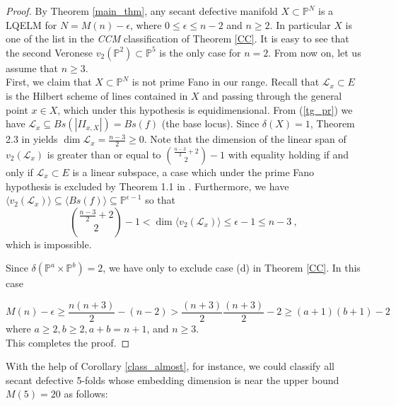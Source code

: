 \documentclass[11pt]{amsart}
\def\P{{\mathbb P}}
\theoremstyle{theorem} %
\theoremstyle{definition}
\numberwithin{equation}{section}
\begin{document}
\begin{proof}
By Theorem \ref{main_thm}, any secant defective manifold $X\subset\P^N$ is a LQELM for $N=M(n)-\epsilon$, where  $0\le\epsilon\le n-2$ and $n\ge 2$. In particular $X$ is one of the list in the \textit{CCM} classification of Theorem \ref{CC}. It is easy to see that the second Veronese $v_2(\P^2)\subset\P^5$ is the only case for $n=2$. From now on, let us assume that $n\ge3$.\\

First, we claim that $X\subset\P^N$ is not prime Fano in our range. Recall that $\mathcal{L}_x\subset E$ is the Hilbert scheme of lines contained in $X$ and passing through the general point $x\in X$, which under this hypothesis is equidimensional. From (\ref{tg_pr}) we have $\mathcal L_{x}\subseteq Bs(|II_{x,X}|)=Bs(f)$ (the base locus). Since $\delta(X)=1$, Theorem 2.3 in \cite{Ru} yields $\dim\mathcal{L}_x =\frac{n-3}{2}\ge 0$. Note that the dimension of the linear span of $v_2(\mathcal{L}_x)$ is greater than or equal to ${\frac{n-3}{2}+2 \choose 2}-1$ with equality holding if and only if $\mathcal{L}_x\subset E$ is a linear subspace, a case which under the prime Fano hypothesis is excluded by Theorem 1.1 in \cite{Ar}. Furthermore, we have $\langle v_2(\mathcal{L}_x)\rangle\subseteq\langle Bs(f)\rangle\subseteq\P^{\epsilon-1}$ so that 
\begin{equation}\label{a1}
{\frac{n-3}{2}+2 \choose 2}-1 < \dim\langle v_2(\mathcal{L}_x)\rangle\le\epsilon-1\le n-3~,
\end{equation}
which is impossible.

Since $\delta(\P^a\times\P^b)=2$, we have only to exclude case (d) in Theorem \ref{CC}. In this case

\begin{displaymath}
M(n)-\epsilon\ge\frac{n(n+3)}{2}-(n-2) > \frac{(n+3)}{2}\frac{(n+3)}{2}-2\ge (a+1)(b+1)-2
\end{displaymath}
where $a\ge2, b\ge2, a+b=n+1$, and $n\ge3$.\\

This completes the proof.
\end{proof}

With the help of Corollary \ref{class_almost}, for instance, we could classify all secant defective 5-folds whose embedding dimension is near the upper bound $M(5)=20$ as follows:
\end{document}
